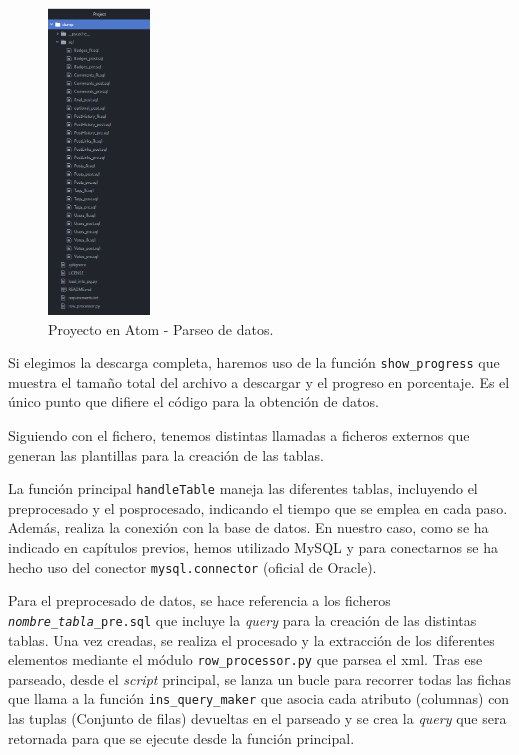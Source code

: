 \documentclass[a4paper, 12pt]{book}
\begin{document}
\begin{figure} %
    \centering
    \includegraphics[width=0.24\textwidth]{img/proyecto-atom.png}
    \caption{Proyecto en Atom - Parseo de datos.}\label{fig:proyecto-atom}
\end{figure}

Si elegimos la descarga completa, haremos uso de la función \texttt{show\_progress} que muestra el tamaño total del archivo a descargar y el progreso en porcentaje. Es el único punto que difiere el código para la obtención de datos.

Siguiendo con el fichero, tenemos distintas llamadas a ficheros externos que generan las plantillas para la creación de las tablas.

La función principal \texttt{handleTable} maneja las diferentes tablas, incluyendo el preprocesado y el posprocesado, indicando el tiempo que se emplea en cada paso. Además,  realiza la conexión con la base de datos. En nuestro caso, como se ha indicado en capítulos previos, hemos utilizado MySQL y para conectarnos se ha hecho uso del conector \texttt{mysql.connector} (oficial de Oracle).

Para el preprocesado de datos, se hace referencia a los ficheros \texttt{\emph{nombre\_tabla}\_pre.sql} que incluye la \emph{query} para la creación de las distintas tablas. Una vez creadas, se realiza el procesado y la extracción de los diferentes elementos mediante el módulo \texttt{row\_processor.py} que parsea el \gls{xml}. Tras ese parseado, desde el \emph{script} principal, se lanza un bucle para recorrer todas las fichas que llama a la función \texttt{ins\_query\_maker} que asocia cada atributo (columnas) con las tuplas (Conjunto de filas) devueltas en el parseado y se crea la \emph{query} que sera retornada para que se ejecute desde la función principal.
\end{document}

